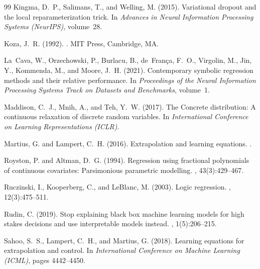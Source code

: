 \documentclass[11pt,a4paper]{article}
\begin{document}
\begin{thebibliography}{99}
Kingma, D.~P., Salimans, T., and Welling, M. (2015).
\newblock Variational dropout and the local reparameterization trick.
\newblock In {\em Advances in Neural Information Processing Systems (NeurIPS)}, volume~28.

Koza, J.~R. (1992).
.
\newblock MIT Press, Cambridge, MA.

La~Cava, W., Orzechowski, P., Burlacu, B., de~Fran{\c{c}}a, F.~O., Virgolin, M., Jin, Y., Kommenda, M., and Moore, J.~H. (2021).
\newblock Contemporary symbolic regression methods and their relative performance.
\newblock In {\em Proceedings of the Neural Information Processing Systems Track on Datasets and Benchmarks}, volume~1.

Maddison, C.~J., Mnih, A., and Teh, Y.~W. (2017).
\newblock The {C}oncrete distribution: A continuous relaxation of discrete random variables.
\newblock In {\em International Conference on Learning Representations (ICLR)}.

Martius, G. and Lampert, C.~H. (2016).
\newblock Extrapolation and learning equations.
.

Royston, P. and Altman, D.~G. (1994).
\newblock Regression using fractional polynomials of continuous covariates: Parsimonious parametric modelling.
, 43(3):429--467.

Ruczinski, I., Kooperberg, C., and LeBlanc, M. (2003).
\newblock Logic regression.
, 12(3):475--511.

Rudin, C. (2019).
\newblock Stop explaining black box machine learning models for high stakes decisions and use interpretable models instead.
, 1(5):206--215.

Sahoo, S.~S., Lampert, C.~H., and Martius, G. (2018).
\newblock Learning equations for extrapolation and control.
\newblock In {\em International Conference on Machine Learning (ICML)}, pages 4442--4450.


\end{thebibliography}
\end{document}
